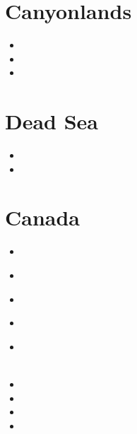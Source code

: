 \section{Canyonlands}

\begin{small}
\begin{itemize}
\item[\nineteenninetyfour]
\item[\twothousandtwo]
\item[\twothousandthree]
\end{itemize}
\end{small}

\section{Dead Sea} 

\begin{small}
\begin{itemize}
\item[\twothousandfive]
\item[\twothousandeleven]
\end{itemize}
\end{small}

\section{Canada}

\begin{small}
\begin{itemize}
\item[\nineteeneighty]
\item[\nineteenninetythree]
 \\ 
\item[\nineteenninetyeight]
\item[\nineteenninetynine]
 \\
\item[\twothousandten]
 \\
 \\
\item[\twothousandthirteen]
\item[\twothousandthirteen]
\item[\twothousandtwenty]
\item[\twothousandtwentythree]
\end{itemize}
\end{small}

